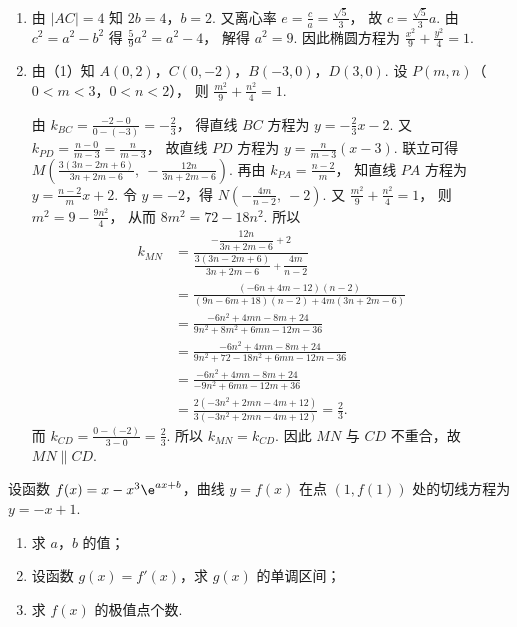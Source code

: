 \begin{solution}
\begin{enumerate}
\item 由 \(|AC|=4\) 知
\(2b=4\)，\(b=2\).
又离心率
\(e=\frac{c}{a}=\frac{\sqrt{5}}{3}\)，
故
\(c=\frac{\sqrt{5}}{3}a\).
由
\(c^2=a^2-b^2\)
得
\(\frac{5}{9}a^2=a^2-4\)，
解得
\(a^2=9\).
因此椭圆方程为
\(\frac{x^2}{9}+\frac{y^2}{4}=1\).

\item 由（1）知
\(A(0,2)\)，\(C(0,-2)\)，\(B(-3,0)\)，\(D(3,0)\).
设
\(P(m,n)\)（\(0<m<3\)，\(0<n<2\)），
则
\(\frac{m^2}{9}+\frac{n^2}{4}=1\).


由
\(k_{BC}=\frac{-2-0}{0-(-3)}=-\frac{2}{3}\)，
得直线 \(BC\) 方程为
\(y=-\frac{2}{3}x-2\).
又
\(k_{PD}=\frac{n-0}{m-3}=\frac{n}{m-3}\)，
故直线 \(PD\) 方程为
\(y=\frac{n}{m-3}(x-3)\).
联立可得
\(M\left(\frac{3(3n-2m+6)}{3n+2m-6},\ -\frac{12n}{3n+2m-6}\right)\).
再由
\(k_{PA}=\frac{n-2}{m}\)，
知直线 \(PA\) 方程为
\(y=\frac{n-2}{m}x+2\).
令 \(y=-2\)，得
\(N\left(-\frac{4m}{n-2},\ -2\right)\).
又
\(\frac{m^2}{9}+\frac{n^2}{4}=1\)，
则
\(m^2=9-\frac{9n^2}{4}\)，
从而
\(8m^2=72-18n^2\).
所以
\[
\begin{aligned}
k_{MN}
&=\frac{-\dfrac{12n}{3n+2m-6}+2}{\dfrac{3(3n-2m+6)}{3n+2m-6}+\dfrac{4m}{n-2}} \\
&=\frac{(-6n+4m-12)(n-2)}{(9n-6m+18)(n-2)+4m(3n+2m-6)} \\
&=\frac{-6n^2+4mn-8m+24}{9n^2+8m^2+6mn-12m-36} \\
&=\frac{-6n^2+4mn-8m+24}{9n^2+72-18n^2+6mn-12m-36} \\
&=\frac{-6n^2+4mn-8m+24}{-9n^2+6mn-12m+36} \\
&=\frac{2(-3n^2+2mn-4m+12)}{3(-3n^2+2mn-4m+12)}
=\frac{2}{3}.
\end{aligned}
\]
而
\(k_{CD}=\frac{0-(-2)}{3-0}=\frac{2}{3}\).
所以
\(k_{MN}=k_{CD}\).
因此 \(MN\) 与 \(CD\) 不重合，故
\(MN\parallel CD\).
\end{enumerate}
\end{solution}

\begin{problem}
设函数 \(f(x)=x-x^3\e^{ax+b}\)，曲线 \(y=f(x)\) 在点 \((1,f(1))\) 处的切线方程为 \(y=-x+1\).

\begin{enumerate}
\item 求 \(a\)，\(b\) 的值；
\item 设函数 \(g(x)=f'(x)\)，求 \(g(x)\) 的单调区间；
\item 求 \(f(x)\) 的极值点个数.
\end{enumerate}
\end{problem}

